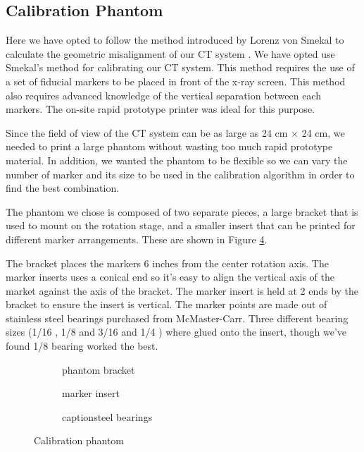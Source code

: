 \subsection{Calibration Phantom}
Here we have opted to follow the method introduced by Lorenz von Smekal to calculate the geometric misalignment of our CT system \cite{Smekal2004}. 
We have opted use Smekal's method for calibrating our CT system.  This method requires the use of a set of fiducial markers to be placed in front of the x-ray screen.  This method also requires advanced knowledge of the vertical separation between each markers.  The on-site rapid prototype printer was ideal for this purpose.

Since the field of view of the CT system can be as large as 24 cm $\times$ 24 cm, we needed to print a large phantom without wasting too much rapid prototype material.  In addition, we wanted the phantom to be flexible so we can vary the number of marker and its size to be used in the calibration algorithm in order to find the best combination.

The phantom we chose is composed of two separate pieces, a large bracket that is used to mount on the rotation stage, and a smaller insert that can be printed for different marker arrangements.  These are shown in Figure \ref{fig:calibration_phantom}.  

The bracket places the markers 6 inches from the center rotation axis.  The marker inserts uses a conical end so it's easy to align the vertical axis of the market against the axis of the bracket.  The marker insert is held at 2 ends by the bracket to ensure the insert is vertical.  The marker points are made out of stainless steel bearings purchased from McMaster-Carr.  Three different bearing sizes (1/16 \inches, 1/8 \inches and 3/16 \inches and 1/4 \inches) where glued onto the insert, though we've found 1/8 \inches bearing worked the best.  

\begin{figure}
\centering
	\begin{subfigure}[b]{0.3\linewidth}
	\centering
	\caption{phantom bracket}
	\label{fig:phantom_bracket}
	\end{subfigure}
\hspace{0.2cm}
	\begin{subfigure}[b]{0.3\linewidth}
	\centering
	\caption{marker insert}
	\label{fig:marker_holder}
	\end{subfigure}
\hspace{0.2cm}
	\begin{subfigure}[b]{0.3\linewidth}
	\centering
	caption{steel bearings}
	\label{fig:steel_bearings}
	\end{subfigure}
\caption{Calibration phantom}
\label{fig:calibration_phantom}
\end{figure}


